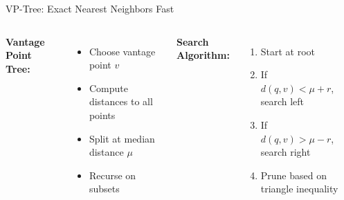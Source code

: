 \documentclass[aspectratio=169]{beamer}
\begin{document}
\begin{frame}{VP-Tree: Exact Nearest Neighbors Fast}
\begin{columns}
\textbf{Vantage Point Tree:}
\begin{itemize}
\item Choose vantage point $v$
\item Compute distances to all points
\item Split at median distance $\mu$
\item Recurse on subsets
\end{itemize}

\textbf{Search Algorithm:}
\begin{enumerate}
\item Start at root
\item If $d(q,v) < \mu + r$, search left
\item If $d(q,v) > \mu - r$, search right
\item Prune based on triangle inequality
\end{enumerate}

\begin{center}
\end{center}
\end{columns}
\end{frame}
\end{document}
